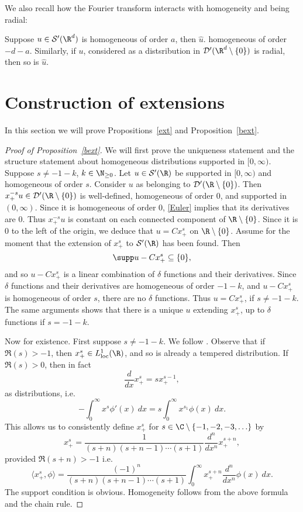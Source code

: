 \documentclass[12pt]{article}
\begin{document}
We also recall how the Fourier transform interacts with homogeneity and being radial:
\begin{prop}Suppose $u \in \mathcal S'(\R^d)$ is homogeneous of order $a$, then $\widehat{u}$. homogeneous of order $-d-a$. Similarly, if $u$, considered as a distsribution in $\mathcal D'(\R^d\setminus\{0\})$ is radial, then so is $\widehat{u}$.\end{prop}

\section{Construction of extensions}
In this section we will prove Propositions~\ref{ext} and Proposition~\ref{bext}.
\begin{proof}[Proof of Proposition~\ref{bext}]We will first prove the uniqueness statement and the structure statement about homogeneous distributions supported in $[0,\infty)$. Suppose $s \neq -1-k$, $k \in \N_{\geq 0}$. Let $u \in \mathcal S'(\R)$ be supported in $[0,\infty)$ and homogeneous of order $s$. Consider $u$ as belonging to $\mathcal D'(\R\setminus\{0\})$. Then $x_+^{-s}u \in \mathcal D'(\R\setminus\{0\})$ is well-defined, homogeneous of order $0$, and supported in $(0,\infty)$. Since it is homogeneous of order $0$, \eqref{Euler} implies that its derivatives are $0$. Thus $x_+^{-s}u$ is constant on each connected component of $\R\setminus\{0\}$. Since it is $0$ to the left of the origin, we deduce that $u = Cx_+^{s}$ on $\R\setminus\{0\}$. Assume for the moment that the extension of $x_+^s$ to $\mathcal S'(\R)$ has been found. Then
\[\supp u - Cx_+^s \subseteq \{0\},\] and so $u - Cx_+^s$ is a linear combination of $\delta$ functions and their derivatives. Since $\delta$ functions and their derivatives are homogeneous of order $-1-k$, and $u-Cx_+^s$ is homogeneous of order $s$, there are no $\delta$ functions. Thus $u = Cx_+^s$, if $s \neq -1-k$. The same arguments shows that there is a unique $u$ extending $x_+^s$, up to $\delta$ functions if $s = -1-k$.


Now for existence. First suppose $s \neq -1-k$. We follow \cite[\S 3.2]{Hor}. Observe that if $\Re(s) > -1$, then $x_+^s \in L^1_{\text{loc}}(\R)$, and so is already a tempered distribution. If $\Re(s) > 0$, then in fact
\[\frac{d}{dx} x_+^s = sx_+^{s-1},\]
as distributions,
i.e.
\[-\int_0^\infty x^s\phi'(x) \ dx = s\int_0^\infty x^{s_1}\phi(x)\ dx.\]
This allows us to consistently define $x_+^s$ for $s \in \C\setminus\{-1,-2,-3,\ldots\}$ by
\[x_+^s = \frac{1}{(s+n)(s+n-1)\cdots (s+1)}\frac{d^n}{dx^n} x_+^{s+n},\]
provided $\Re(s+n) > -1$
i.e.
\[\langle x_+^s,\phi\rangle = \frac{(-1)^n}{(s+n)(s+n-1)\cdots (s+1)}\int_0^\infty x_+^{s+n}\frac{d^n}{dx^n} \phi(x)\ dx.\]
The support condition is obvious. Homogeneity follows from the above formula and the chain rule.


\end{proof}
\end{document}

